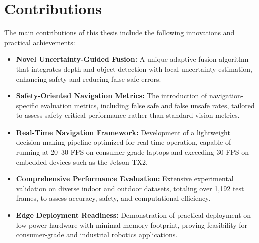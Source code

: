 \documentclass[12pt,oneside]{book}
\begin{document}
\section{Contributions}
The main contributions of this thesis include the following innovations and practical achievements:
\begin{itemize}
    \item \textbf{Novel Uncertainty-Guided Fusion:} A unique adaptive fusion algorithm that integrates depth and object detection with local uncertainty estimation, enhancing safety and reducing false safe errors.
    \item \textbf{Safety-Oriented Navigation Metrics:} The introduction of navigation-specific evaluation metrics, including false safe and false unsafe rates, tailored to assess safety-critical performance rather than standard vision metrics.
    \item \textbf{Real-Time Navigation Framework:} Development of a lightweight decision-making pipeline optimized for real-time operation, capable of running at 20–30 FPS on consumer-grade laptops and exceeding 30 FPS on embedded devices such as the Jetson TX2.
    \item \textbf{Comprehensive Performance Evaluation:} Extensive experimental validation on diverse indoor and outdoor datasets, totaling over 1,192 test frames, to assess accuracy, safety, and computational efficiency.
    \item \textbf{Edge Deployment Readiness:} Demonstration of practical deployment on low-power hardware with minimal memory footprint, proving feasibility for consumer-grade and industrial robotics applications.
\end{itemize}
\end{document}

